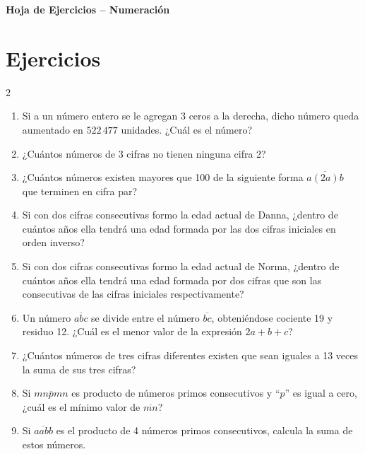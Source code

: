\documentclass[10pt]{article}
\begin{document}
\begin{center}
    \Large\bfseries Hoja de Ejercicios -- Numeración
\end{center}

\section*{Ejercicios}

\begin{multicols}{2}
\begin{enumerate}[label=\textbf{\arabic*.}, itemsep=0.5cm]

    \item Si a un número entero se le agregan 3 ceros a la derecha, dicho número queda aumentado en $522\,477$ unidades. ¿Cuál es el número?

    \item ¿Cuántos números de 3 cifras no tienen ninguna cifra 2?

    \item ¿Cuántos números existen mayores que 100 de la siguiente forma $\overline{a(2a)b}$ que terminen en cifra par? 
    
    \item Si con dos cifras consecutivas formo la edad actual de Danna, ¿dentro de cuántos años ella tendrá una edad formada por las dos cifras iniciales en orden inverso?
    
    \item Si con dos cifras consecutivas formo la edad actual de Norma, ¿dentro de cuántos años ella tendrá una edad formada por dos cifras que son las consecutivas de las cifras iniciales respectivamente?

    \item Un número $\overline{abc}$ se divide entre el número $\overline{bc}$, obteniéndose cociente 19 y residuo 12. ¿Cuál es el menor valor de la expresión $2a + b + c$?

    \item ¿Cuántos números de tres cifras diferentes existen que sean iguales a 13 veces la suma de sus tres cifras?

    \item Si $\overline{mnpmn}$ es producto de números primos consecutivos y ``$p$'' es igual a cero, ¿cuál es el mínimo valor de $\overline{mn}$?

    \item Si $\overline{aabb}$ es el producto de 4 números primos consecutivos, calcula la suma de estos números.


\end{enumerate}
\end{multicols}
\end{document}
